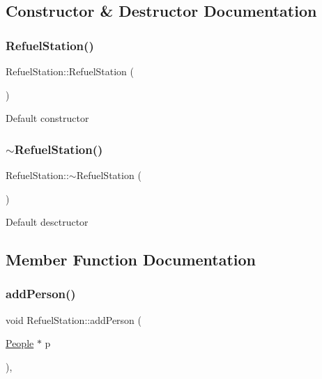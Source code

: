 \subsection{Constructor \& Destructor Documentation}
\mbox{\label{classRefuelStation_a3ab9b746bd1e7bfaa9eff06567d6a1d4}} 
\subsubsection{\texorpdfstring{Refuel\+Station()}{RefuelStation()}}
{\footnotesize\ttfamily Refuel\+Station\+::\+Refuel\+Station (\begin{DoxyParamCaption}{ }\end{DoxyParamCaption})}

Default constructor \mbox{\label{classRefuelStation_afc0ebc020ef08d8a6a2096bdb2f3e314}} 
\subsubsection{\texorpdfstring{$\sim$\+Refuel\+Station()}{~RefuelStation()}}
{\footnotesize\ttfamily Refuel\+Station\+::$\sim$\+Refuel\+Station (\begin{DoxyParamCaption}{ }\end{DoxyParamCaption})}

Default desctructor 

\subsection{Member Function Documentation}
\mbox{\label{classRefuelStation_a6bd40214cf5dc4d46739943f545c6d7a}} 
\subsubsection{\texorpdfstring{add\+Person()}{addPerson()}}
{\footnotesize\ttfamily void Refuel\+Station\+::add\+Person (\begin{DoxyParamCaption}\item[{\hyperlink{classPeople}{People} $\ast$}]{p }\end{DoxyParamCaption})\hspace{0.3cm}{\ttfamily [inline]}, {\ttfamily [virtual]}}

